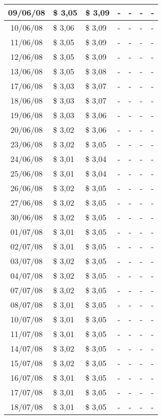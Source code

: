 \begin{center}
\begin{longtable}{|c|p{1.5cm}|p{1.5cm}|p{1.5cm}|p{1.5cm}|p{1.5cm}|p{1.5cm}|}
09/06/08 & \$ 3,05 & \$ 3,09 & - & - & - & - \\ \hline
10/06/08 & \$ 3,06 & \$ 3,09 & - & - & - & - \\ \hline
11/06/08 & \$ 3,05 & \$ 3,09 & - & - & - & - \\ \hline
12/06/08 & \$ 3,05 & \$ 3,09 & - & - & - & - \\ \hline
13/06/08 & \$ 3,05 & \$ 3,08 & - & - & - & - \\ \hline
17/06/08 & \$ 3,03 & \$ 3,07 & - & - & - & - \\ \hline
18/06/08 & \$ 3,03 & \$ 3,07 & - & - & - & - \\ \hline
19/06/08 & \$ 3,03 & \$ 3,06 & - & - & - & - \\ \hline
20/06/08 & \$ 3,02 & \$ 3,06 & - & - & - & - \\ \hline
23/06/08 & \$ 3,02 & \$ 3,05 & - & - & - & - \\ \hline
24/06/08 & \$ 3,01 & \$ 3,04 & - & - & - & - \\ \hline
25/06/08 & \$ 3,01 & \$ 3,04 & - & - & - & - \\ \hline
26/06/08 & \$ 3,02 & \$ 3,05 & - & - & - & - \\ \hline
27/06/08 & \$ 3,02 & \$ 3,05 & - & - & - & - \\ \hline
30/06/08 & \$ 3,02 & \$ 3,05 & - & - & - & - \\ \hline
01/07/08 & \$ 3,01 & \$ 3,05 & - & - & - & - \\ \hline
02/07/08 & \$ 3,01 & \$ 3,05 & - & - & - & - \\ \hline
03/07/08 & \$ 3,02 & \$ 3,05 & - & - & - & - \\ \hline
04/07/08 & \$ 3,02 & \$ 3,05 & - & - & - & - \\ \hline
07/07/08 & \$ 3,02 & \$ 3,05 & - & - & - & - \\ \hline
08/07/08 & \$ 3,01 & \$ 3,05 & - & - & - & - \\ \hline
10/07/08 & \$ 3,01 & \$ 3,05 & - & - & - & - \\ \hline
11/07/08 & \$ 3,01 & \$ 3,05 & - & - & - & - \\ \hline
14/07/08 & \$ 3,02 & \$ 3,05 & - & - & - & - \\ \hline
15/07/08 & \$ 3,02 & \$ 3,05 & - & - & - & - \\ \hline
16/07/08 & \$ 3,01 & \$ 3,05 & - & - & - & - \\ \hline
17/07/08 & \$ 3,01 & \$ 3,05 & - & - & - & - \\ \hline
18/07/08 & \$ 3,01 & \$ 3,05 & - & - & - & - \\ \hline

\end{longtable}
\end{center}
